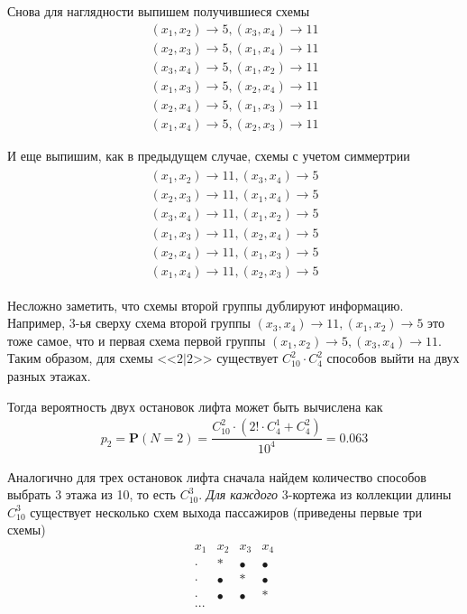 \documentclass[%
	11pt,
	a4paper,
	utf8,
		]{article}
\begin{document}
Снова для наглядности выпишем получившиеся схемы
\begin{align*}
	(x_1, x_2) \rightarrow 5, (x_3, x_4) \rightarrow 11 \\
	(x_2, x_3) \rightarrow 5, (x_1, x_4) \rightarrow 11 \\
	(x_3, x_4) \rightarrow 5, (x_1, x_2) \rightarrow 11 \\
	(x_1, x_3) \rightarrow 5, (x_2, x_4) \rightarrow 11 \\
	(x_2, x_4) \rightarrow 5, (x_1, x_3) \rightarrow 11 \\
	(x_1, x_4) \rightarrow 5, (x_2, x_3) \rightarrow 11
\end{align*}

И еще выпишим, как в предыдущем случае, схемы с учетом симмертрии
\begin{align*}
	\begin{matrix}
		(x_1, x_2) \rightarrow 11, (x_3, x_4) \rightarrow 5 \\
		(x_2, x_3) \rightarrow 11, (x_1, x_4) \rightarrow 5 \\
		(x_3, x_4) \rightarrow 11, (x_1, x_2) \rightarrow 5 \\
		(x_1, x_3) \rightarrow 11, (x_2, x_4) \rightarrow 5 \\
		(x_2, x_4) \rightarrow 11, (x_1, x_3) \rightarrow 5 \\
		(x_1, x_4) \rightarrow 11, (x_2, x_3) \rightarrow 5
	\end{matrix}
\end{align*}

Несложно заметить, что схемы второй группы дублируют информацию. Например, 3-ья сверху схема второй группы $ (x_3, x_4) \rightarrow 11, (x_1, x_2) \rightarrow 5 $ это тоже самое, что и первая схема первой группы $ (x_1, x_2) \rightarrow 5, (x_3, x_4) \rightarrow 11 $. Таким образом, для схемы <<$ 2|2 $>> существует $ C_{10}^2 \cdot C_4^2 $ способов выйти на двух разных этажах.

Тогда вероятность двух остановок лифта может быть вычислена как
\begin{align*}
	p_2 = \mathbf{P}(N = 2) = \dfrac{ C_{10}^2 \cdot (2! \cdot C_4^1 + C_4^2)}{ 10^4 } = 0.063
\end{align*}

Аналогично для трех остановок лифта сначала найдем количество способов выбрать 3 этажа из 10, то есть $ C_{10}^3 $. \emph{Для каждого} 3-кортежа  из коллекции длины $ C_{10}^3 $ существует несколько схем выхода пассажиров (приведены первые три схемы)
\begin{align*}
	\begin{matrix}
		x_1 & x_2 & x_3 & x_4 \\
		\cdot & \ast & \bullet & \bullet \\
		\cdot & \bullet & \ast & \bullet \\
		\cdot & \bullet & \bullet & \ast \\
		... & {} & {} & {}
	\end{matrix}
\end{align*}
\end{document}
